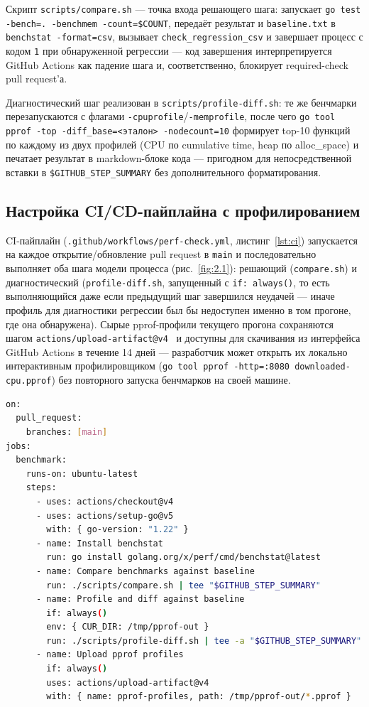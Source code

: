 \documentclass[12pt,a4paper]{article}
\numberwithin{equation}{section}
\begin{document}
Скрипт \texttt{scripts/\allowbreak compare.sh} — точка входа решающего шага: запускает
\texttt{go test -bench=. -benchmem -count=\$COUNT}, передаёт результат и
\texttt{baseline.txt} в \texttt{benchstat -format=csv}, вызывает
\texttt{check\_regression\_csv} и завершает процесс с кодом \texttt{1} при
обнаруженной регрессии — код завершения интерпретируется GitHub Actions как
падение шага и, соответственно, блокирует required-check pull request'а.

Диагностический шаг реализован в \texttt{scripts/\allowbreak profile-diff.sh}: те же
бенчмарки перезапускаются с флагами \texttt{-cpuprofile}/\texttt{-memprofile},
после чего \texttt{go tool pprof -top -diff\_base=<эталон> -nodecount=10}
формирует top-10 функций по каждому из двух профилей (CPU по cumulative
time, heap по alloc\_space) и печатает результат в markdown-блоке кода —
пригодном для непосредственной вставки в \texttt{\$GITHUB\_STEP\_SUMMARY}
без дополнительного форматирования.

\subsection{Настройка CI/CD-пайплайна с профилированием}
\label{sec:4.2}

CI-пайплайн (\texttt{.github/\allowbreak workflows/\allowbreak perf-check.yml}, листинг~\ref{lst:ci})
запускается на каждое открытие/обновление pull request в \texttt{main} и
последовательно выполняет оба шага модели процесса (рис.~\ref{fig:2.1}):
решающий (\texttt{compare.sh}) и диагностический (\texttt{profile-diff.sh},
запущенный с \texttt{if: always()}, то есть выполняющийся даже если
предыдущий шаг завершился неудачей — иначе профиль для диагностики
регрессии был бы недоступен именно в том прогоне, где она обнаружена).
Сырые pprof-профили текущего прогона сохраняются шагом
\texttt{actions/\allowbreak upload-artifact@v4}~\cite{gh-upload-artifact} и доступны для скачивания из интерфейса
GitHub Actions в течение 14 дней — разработчик может открыть их локально
интерактивным профилировщиком (\texttt{go tool pprof -http=:8080
downloaded-cpu.pprof}) без повторного запуска бенчмарков на своей машине.

\begin{lstlisting}[language=bash,caption={CI-пайплайн --- .github/workflows/perf-check.yml (ключевые шаги)},label={lst:ci}]
on:
  pull_request:
    branches: [main]
jobs:
  benchmark:
    runs-on: ubuntu-latest
    steps:
      - uses: actions/checkout@v4
      - uses: actions/setup-go@v5
        with: { go-version: "1.22" }
      - name: Install benchstat
        run: go install golang.org/x/perf/cmd/benchstat@latest
      - name: Compare benchmarks against baseline
        run: ./scripts/compare.sh | tee "$GITHUB_STEP_SUMMARY"
      - name: Profile and diff against baseline
        if: always()
        env: { CUR_DIR: /tmp/pprof-out }
        run: ./scripts/profile-diff.sh | tee -a "$GITHUB_STEP_SUMMARY"
      - name: Upload pprof profiles
        if: always()
        uses: actions/upload-artifact@v4
        with: { name: pprof-profiles, path: /tmp/pprof-out/*.pprof }
\end{lstlisting}
\end{document}
